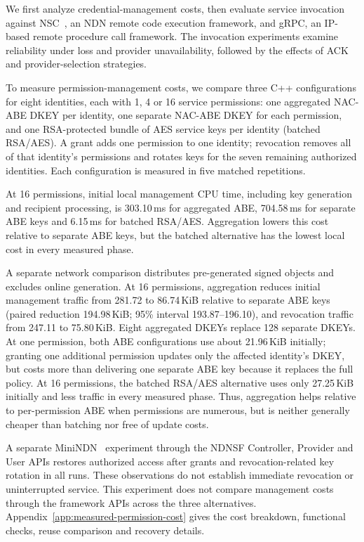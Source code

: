 \label{sec:eval}

We first analyze credential-management costs, then evaluate service invocation against NSC~\cite{meirovitch2021nsc}, an NDN remote code execution framework, and gRPC, an IP-based remote procedure call framework. The invocation experiments examine reliability under loss and provider unavailability, followed by the effects of ACK and provider-selection strategies.



To measure permission-management costs, we compare three C++ configurations for eight identities, each with 1, 4 or 16 service permissions: one aggregated NAC-ABE DKEY per identity, one separate NAC-ABE DKEY for each permission, and one RSA-protected bundle of AES service keys per identity (batched RSA/AES). A grant adds one permission to one identity; revocation removes all of that identity's permissions and rotates keys for the seven remaining authorized identities. Each configuration is measured in five matched repetitions.

At 16 permissions, initial local management CPU time, including key generation and recipient processing, is 303.10\,ms for aggregated ABE, 704.58\,ms for separate ABE keys and 6.15\,ms for batched RSA/AES. Aggregation lowers this cost relative to separate ABE keys, but the batched alternative has the lowest local cost in every measured phase.

A separate network comparison distributes pre-generated signed objects and excludes online generation. At 16 permissions, aggregation reduces initial management traffic from 281.72 to 86.74\,KiB relative to separate ABE keys (paired reduction 194.98\,KiB; 95\% interval 193.87--196.10), and revocation traffic from 247.11 to 75.80\,KiB. Eight aggregated DKEYs replace 128 separate DKEYs. At one permission, both ABE configurations use about 21.96\,KiB initially; granting one additional permission updates only the affected identity's DKEY, but costs more than delivering one separate ABE key because it replaces the full policy. At 16 permissions, the batched RSA/AES alternative uses only 27.25\,KiB initially and less traffic in every measured phase. Thus, aggregation helps relative to per-permission ABE when permissions are numerous, but is neither generally cheaper than batching nor free of update costs.

A separate MiniNDN~\cite{MININDN} experiment through the NDNSF Controller, Provider and User APIs restores authorized access after grants and revocation-related key rotation in all runs. These observations do not establish immediate revocation or uninterrupted service. This experiment does not compare management costs through the framework APIs across the three alternatives. Appendix~\ref{app:measured-permission-cost} gives the cost breakdown, functional checks, reuse comparison and recovery details.

